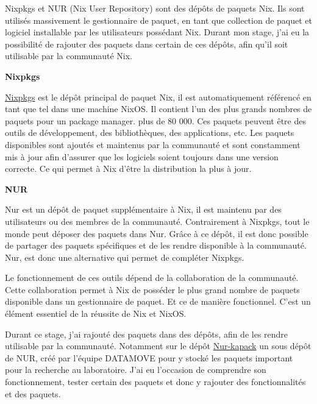 \documentclass[a4paper,french,12pt, titlepage]{article}
\begin{document}
Nixpkgs et NUR (Nix User Repository) sont des dépôts de paquets Nix. Ils
sont utilisés massivement le gestionnaire de paquet, en tant que
collection de paquet et logiciel installable par les utilisateurs
possédant Nix. Durant mon stage, j'ai eu la possibilité de rajouter des
paquets dans certain de ces dépôts, afin qu'il soit utilisable par la
communauté Nix.\newline

\textbf{Nixpkgs}\newline

\href{https://github.com/NixOS/nixpkgs}{Nixpkgs} est le dépôt principal
de paquet Nix, il est automatiquement référencé en tant que tel dans une
machine NixOS. Il contient l'un des plus grands nombres de paquets pour
un package manager. plus de 80 000. Ces paquets peuvent être des outils
de développement, des bibliothèques, des applications, etc. Les paquets
disponibles sont ajoutés et maintenus par la communauté et sont
constamment mis à jour afin d'assurer que les logiciels soient toujours
dans une version correcte. Ce qui permet à Nix d'être la distribution la
plus à jour.\newline

\textbf{NUR}\newline

Nur est un dépôt de paquet supplémentaire à Nix, il est maintenu par des
utilisateurs ou des membres de la communauté. Contrairement à Nixpkgs,
tout le monde peut déposer des paquets dans Nur. Grâce à ce dépôt, il
est donc possible de partager des paquets spécifiques et de les rendre
disponible à la communauté. Nur, est donc une alternative qui permet de
compléter Nixpkgs.\newline

Le fonctionnement de ces outils dépend de la collaboration de la
communauté. Cette collaboration permet à Nix de posséder le plus grand
nombre de paquets disponible dans un gestionnaire de paquet. Et ce de
manière fonctionnel. C'est un élément essentiel de la réussite de Nix et
NixOS.\newline

Durant ce stage, j'ai rajouté des paquets dans des dépôts, afin de les
rendre utilisable par la communauté. Notamment sur le dépôt
\href{https://github.com/oar-team/nur-kapack}{Nur-kapack} un sous dépôt
de NUR, créé par l'équipe DATAMOVE pour y stocké les paquets important
pour la recherche au laboratoire. J'ai eu l'occasion de comprendre son
fonctionnement, tester certain des paquets et donc y rajouter des
fonctionnalités et des paquets.
\end{document}
